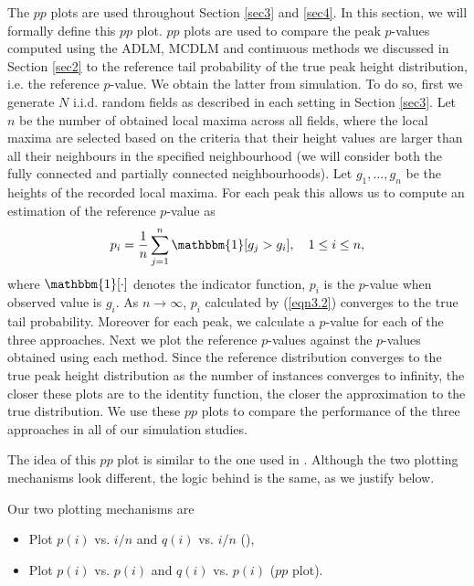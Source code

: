 \documentclass{article}
\begin{document}
The $pp$ plots are used throughout Section \ref{sec3} and \ref{sec4}. In this section, we will formally define this $pp$ plot. $pp$ plots are used to compare the peak $p$-values computed using the ADLM, MCDLM and continuous methods we discussed in Section \ref{sec2} to the reference tail probability of the true peak height distribution, i.e. the reference $p$-value. We obtain the latter from simulation. To do so, first we generate $N$ i.i.d. random fields as described in each setting in Section \ref{sec3}. Let $n$ be the number of obtained local maxima across all fields, where the local maxima are selected based on the criteria that their height values are larger than all their neighbours in the specified neighbourhood (we will consider both the fully connected and partially connected neighbourhoods).  Let $g_1, \dots, g_n$ be the heights of the recorded local maxima. For each peak this allows us to compute an estimation of the reference $p$-value as
\begin{align}
    p_i = \frac{1}{n} \sum_{j = 1}^n \mathbbm{1} [ g_j > g_i],\quad 1 \leq i \leq n,  \label{eqn3.2}
\end{align}
where $\mathbbm{1}[\cdot]$ denotes the indicator function, $p_i$ is the $p$-value when observed value is $g_i$. As $n\rightarrow \infty$, $p_i$ calculated by (\ref{eqn3.2}) converges to the true tail probability. Moreover for each peak, we calculate a $p$-value for each of the three approaches. Next we plot the reference $p$-values against the $p$-values obtained using each method. Since the reference distribution converges to the true peak height distribution as the number of instances converges to infinity, the closer these plots are to the identity function, the closer the approximation to the true distribution. We use these $pp$ plots to compare the performance of the three approaches in all of our simulation studies. 

The idea of this $pp$ plot is similar to the one used in \cite{schwartzman2019peak}. Although the two plotting mechanisms look different, the logic behind is the same, as we justify below. 

Our two plotting mechanisms are
\begin{itemize}
    \item Plot $p(i)$ vs. $i/n$ and $q(i)$ vs. $i/n$ (\cite{schwartzman2019peak}),
    \item Plot $p(i)$ vs. $p(i)$ and $q(i)$ vs. $p(i)$ ($pp$ plot).
\end{itemize}
\end{document}
